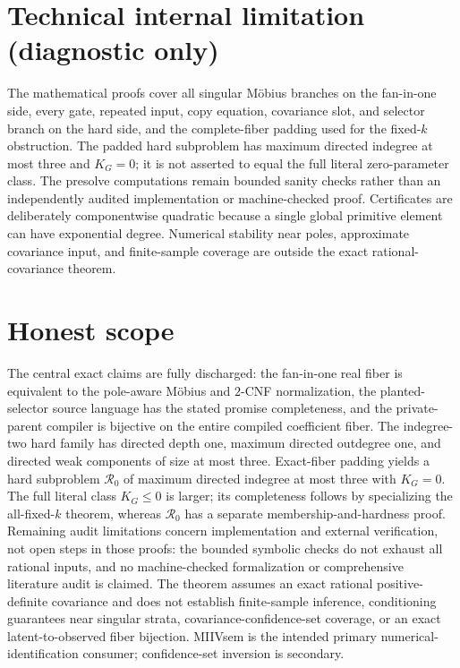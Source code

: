 \documentclass{article}
\begin{document}
\section*{Technical internal limitation (diagnostic only)}

The mathematical proofs cover all singular Möbius branches on the fan-in-one side, every gate, repeated input, copy equation, covariance slot, and selector branch on the hard side, and the complete-fiber padding used for the fixed-\(k\) obstruction. The padded hard subproblem has maximum directed indegree at most three and \(K_G=0\); it is not asserted to equal the full literal zero-parameter class. The presolve computations remain bounded sanity checks rather than an independently audited implementation or machine-checked proof. Certificates are deliberately componentwise quadratic because a single global primitive element can have exponential degree. Numerical stability near poles, approximate covariance input, and finite-sample coverage are outside the exact rational-covariance theorem.

\section{Honest scope}

The central exact claims are fully discharged: the fan-in-one real fiber is equivalent to the pole-aware Möbius and \(2\)-CNF normalization, the planted-selector source language has the stated promise completeness, and the private-parent compiler is bijective on the entire compiled coefficient fiber. The indegree-two hard family has directed depth one, maximum directed outdegree one, and directed weak components of size at most three. Exact-fiber padding yields a hard subproblem \(\mathcal R_0\) of maximum directed indegree at most three with \(K_G=0\). The full literal class \(K_G\leq 0\) is larger; its completeness follows by specializing the all-fixed-\(k\) theorem, whereas \(\mathcal R_0\) has a separate membership-and-hardness proof. Remaining audit limitations concern implementation and external verification, not open steps in those proofs: the bounded symbolic checks do not exhaust all rational inputs, and no machine-checked formalization or comprehensive literature audit is claimed. The theorem assumes an exact rational positive-definite covariance and does not establish finite-sample inference, conditioning guarantees near singular strata, covariance-confidence-set coverage, or an exact latent-to-observed fiber bijection. MIIVsem is the intended primary numerical-identification consumer; confidence-set inversion is secondary.
\end{document}
